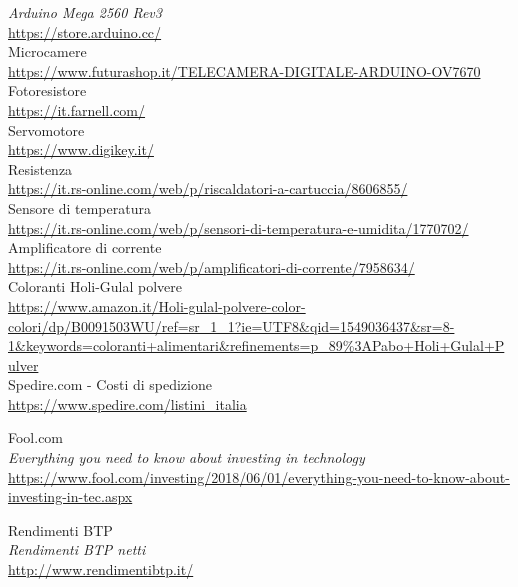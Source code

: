 \begin{thebibliography}{99}
\emph{Arduino Mega 2560 Rev3}\\
\url{https://store.arduino.cc/}
\\
Microcamere\\
\url{https://www.futurashop.it/TELECAMERA-DIGITALE-ARDUINO-OV7670}
\\
Fotoresistore\\
\url{https://it.farnell.com/}
\\
Servomotore\\
\url{https://www.digikey.it/}
\\
Resistenza\\
\url{https://it.rs-online.com/web/p/riscaldatori-a-cartuccia/8606855/}
\\
Sensore di temperatura\\
\url{https://it.rs-online.com/web/p/sensori-di-temperatura-e-umidita/1770702/}
\\
Amplificatore di corrente\\
\url{https://it.rs-online.com/web/p/amplificatori-di-corrente/7958634/}
\\
Coloranti Holi-Gulal polvere\\
\url{https://www.amazon.it/Holi-gulal-polvere-color-colori/dp/B0091503WU/ref=sr_1_1?ie=UTF8&qid=1549036437&sr=8-1&keywords=coloranti+alimentari&refinements=p_89%3APabo+Holi+Gulal+Pulver}
\\

Spedire.com - Costi di spedizione\\
\url{https://www.spedire.com/listini_italia}


Fool.com \\
\emph{Everything you need to know about investing in technology }\\
\url{https://www.fool.com/investing/2018/06/01/everything-you-need-to-know-about-investing-in-tec.aspx}

Rendimenti BTP \\
\emph{Rendimenti BTP netti}\\
\url{http://www.rendimentibtp.it/}

\end{thebibliography}
